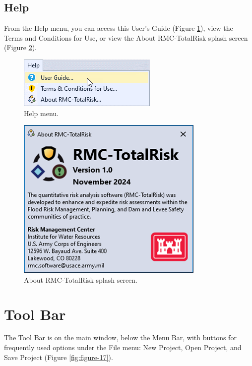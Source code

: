 \documentclass[
]{book}
\begin{document}
\hypertarget{gui-menu-bar-help}{%
\subsection{Help}\label{gui-menu-bar-help}}

From the Help menu, you can access this User's Guide (Figure \ref{fig:figure-15}), view the Terms and Conditions for Use, or view the About RMC-TotalRisk splash screen (Figure \ref{fig:figure-16}).

\begin{figure}

{\centering \includegraphics{images/figure15} 

}

\caption{Help menu.}\label{fig:figure-15}
\end{figure}

\begin{figure}

{\centering \includegraphics{images/figure16} 

}

\caption{About RMC-TotalRisk splash screen.}\label{fig:figure-16}
\end{figure}

\hypertarget{gui-tool-bar}{%
\section{Tool Bar}\label{gui-tool-bar}}

The Tool Bar is on the main window, below the Menu Bar, with buttons for frequently used options under the File menu: New Project, Open Project, and Save Project (Figure \ref{fig:figure-17}).
\end{document}
